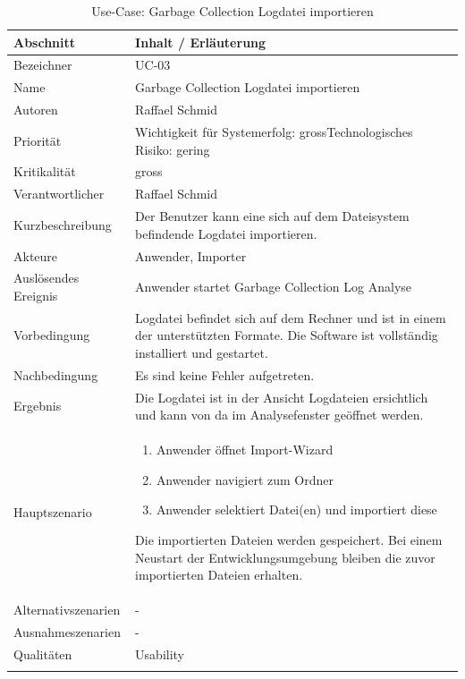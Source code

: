 \begin{longtable}{|p{4cm}|p{10.5cm}|}
\hline
   \textbf{Abschnitt} & \textbf{Inhalt / Erläuterung} \\\hline
   Bezeichner & UC-03\\\hline
   Name & Garbage Collection Logdatei importieren\\\hline
   Autoren & Raffael Schmid\\\hline
   Priorität & Wichtigkeit für Systemerfolg: gross\newline Technologisches Risiko: gering\\\hline
   Kritikalität & gross\\\hline
   Verantwortlicher & Raffael Schmid\\\hline
   Kurzbeschreibung & Der Benutzer kann eine sich auf dem Dateisystem befindende Logdatei importieren.\\\hline
   Akteure & Anwender, Importer\\\hline
   Auslösendes Ereignis & Anwender startet Garbage Collection Log Analyse\\\hline
   Vorbedingung & Logdatei befindet sich auf dem Rechner und ist in einem der unterstützten Formate. Die Software ist vollständig installiert und gestartet.\\\hline
   Nachbedingung & Es sind keine Fehler aufgetreten. \\\hline
   Ergebnis & Die Logdatei ist in der Ansicht Logdateien ersichtlich und kann von da im Analysefenster geöffnet werden.\\\hline
   Hauptszenario & 
	\begin{enumerate}
		\item Anwender öffnet Import-Wizard
		\item Anwender navigiert zum Ordner
		\item Anwender selektiert Datei(en) und importiert diese
	\end{enumerate}
Die importierten Dateien werden gespeichert. Bei einem Neustart der Entwicklungsumgebung bleiben die zuvor importierten Dateien erhalten.
	\\\hline
   Alternativszenarien & -\\\hline
   Ausnahmeszenarien & -\\\hline
   Qualitäten & Usability\\\hline
\caption{Use-Case: Garbage Collection Logdatei importieren}
\end{longtable}

